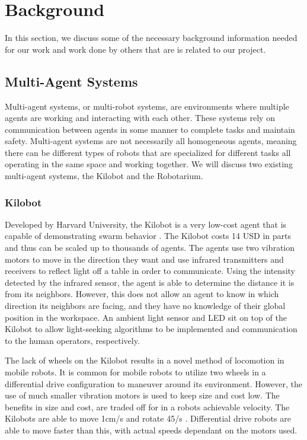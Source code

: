 \chapter{Background}
\label{ch:back}

In this section, we discuss some of the necessary background information needed for our work and work done by others that are is related to our project.

\section{Multi-Agent Systems}

Multi-agent systems, or multi-robot systems, are environments where multiple agents are working and interacting with each other. These systems rely on communication between agents in some manner to complete tasks and maintain safety. Multi-agent systems are not necessarily all homogeneous agents, meaning there can be different types of robots that are specialized for different tasks all operating in the same space and working together. We will discuss two existing multi-agent systems, the Kilobot and the Robotarium.

\subsection{Kilobot}

Developed by Harvard University, the Kilobot is a very low-cost agent that is capable of demonstrating swarm behavior \cite{rubenstein2014kilobot}. The Kilobot costs 14 USD in parts and thus can be scaled up to thousands of agents. The agents use two vibration motors to move in the direction they want and use infrared transmitters and receivers to reflect light off a table in order to communicate. Using the intensity detected by the infrared sensor, the agent is able to determine the distance it is from its neighbors. However, this does not allow an agent to know in which direction its neighbors are facing, and they have no knowledge of their global position in the workspace. An ambient light sensor and LED sit on top of the Kilobot to allow light-seeking algorithms to be implemented and communication to the human operators, respectively. 

The lack of wheels on the Kilobot results in a novel method of locomotion in mobile robots. It is common for mobile robots to utilize two wheels in a differential drive configuration to maneuver around its environment. However, the use of much smaller vibration motors is used to keep size and cost low. The benefits in size and cost, are traded off for in a robots achievable velocity. The Kilobots are able to move 1cm/s and rotate 45\textdegree/s \cite{rubenstein2014kilobot}. Differential drive robots are able to move faster than this, with actual speeds dependant on the motors used. 


